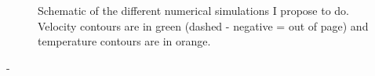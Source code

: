 \begin{figure}[h]
    \centering
     \hfill
     \hfill
    		\caption{Schematic of the different numerical simulations I propose to do. Velocity contours are in green (dashed - negative = out of page) and temperature contours are in orange.}
    \label{fig:simschem}
\end{figure}

-